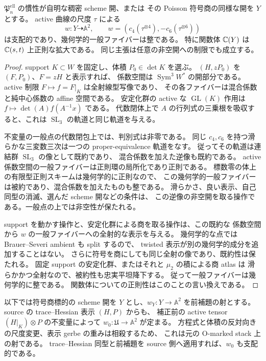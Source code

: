 \begin{lemma}
\label{lem:nfm-active-invariant-regular-fiber}
$\mathfrak P_n^{\mathrm{ell}}$ の慣性が自明な稠密 scheme 開、または
その Poisson 符号商の同様な開を $Y$ とする。
active 曲線の尺度 $\tau$ による
\[
 w:Y\dashrightarrow\mathbb A^2,\qquad
 w=(c_4(\tau^{\otimes4}),-c_6(\tau^{\otimes6}))
\]
は支配的であり、幾何学的一般ファイバーは整である。
特に関数体 $\mathbb C(Y)$ は $\mathbb C(s,t)$ 上正則な拡大である。
同じ主張は任意の非空開への制限でも成立する。
\end{lemma}

\begin{proof}
support $K\subset W$ を固定し、体積 $P_0\in\det K$ を選ぶ。
$(H,zP_0)$ を $(F,P_0)$、$F=zH$ と表示すれば、
係数空間は $\operatorname{Sym}^3W^*$ の開部分である。
active 制限 $F\mapsto f=F|_K$ は全射線型写像であり、
その各ファイバーは混合係数と純中心係数の affine 空間である。
安定化群の active な $\operatorname{GL}(K)$ 作用は
$f\mapsto\det(A)f(A^{-1}x)$ である。
代数閉体上で $A$ の行列式の三乗根を吸収すると、これは
$\operatorname{SL}_3$ の軌道と同じ軌道を与える。

不変量の一般点の代数閉包上では、判別式は非零である。
同じ $c_4,c_6$ を持つ滑らかな三変数三次は一つの proper-equivalence
軌道をなす\cite[Lemma~2.2]{NFMFisherTernary}。
従ってその軌道は連結群 $\operatorname{SL}_3$ の像として既約であり、
混合係数を加えた逆像も既約である。
active 係数空間の一般ファイバーは正則環の局所化であり正則である。
標数零の体上の有限型正則スキームは幾何学的に正則なので、
この幾何学的一般ファイバーは被約であり、混合係数を加えたものも整である。
滑らかさ、良い表示、自己同型の消滅、選んだ scheme 開などの条件は、
この逆像の非空開を取る操作である。一般点の上では非空性が保たれる。

support を動かす操作と、安定化群による商を取る操作は、この既約な
係数空間から $w$ の一般ファイバーへの全射的な表示を与える。
幾何学的な点では Brauer--Severi ambient も split するので、
twisted 表示が別の幾何学的成分を追加することはない。
さらに符号を商にしても同じ全射の像であり、既約性は保たれる。
固定 support の安定化群、またはそれと $\mu_2$ の積による商 atlas は
滑らかかつ全射なので、被約性も忠実平坦降下する。
従って一般ファイバーは幾何学的に整である。
関数体についての正則性はこのことの言い換えである。
\end{proof}

以下では符号商標的の scheme 開を $Y$ とし、$w_Y:Y\to\mathbb A^2$
を前補題の射とする。source の trace--Hessian 表示 $(H,P)$ からも、
補正前の active tensor $(H|_K)\otimes P$ の不変量によって
$w_0:\mathfrak U\to\mathbb A^2$ が定まる。
方程式と体積の反対向きの尺度変更、表示 gerbe の重みは相殺するため、
これは元の O-marked stack 上の射である。
trace--Hessian 同型と前補題を source 側へ適用すれば、$w_0$ も支配的である。

